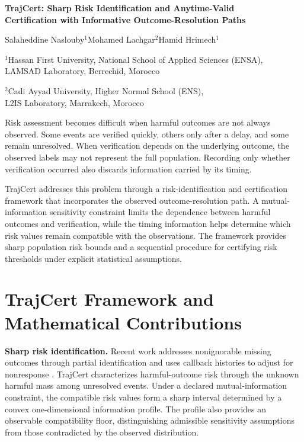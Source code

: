 \documentclass[a4paper,11pt]{article}
\begin{document}
\fontsize{10.5}{12.2}\selectfont
\begin{center}
{\fontsize{15}{17}\selectfont\bfseries TrajCert: Sharp Risk Identification and Anytime-Valid\\Certification with Informative Outcome-Resolution Paths\par}
\vspace{5pt}
Salaheddine Naslouby$^{1}$\quad Mohamed Lachgar$^{2}$\quad Hamid Hrimech$^{1}$\par
\vspace{3pt}
{\small $^{1}$Hassan First University, National School of Applied Sciences (ENSA),\\LAMSAD Laboratory, Berrechid, Morocco\par
$^{2}$Cadi Ayyad University, Higher Normal School (ENS),\\L2IS Laboratory, Marrakech, Morocco\par}
\end{center}
\vspace{-4pt}
Risk assessment becomes difficult when harmful outcomes are not always observed. Some events are verified quickly, others only after a delay, and some remain unresolved. When verification depends on the underlying outcome, the observed labels may not represent the full population. Recording only whether verification occurred also discards information carried by its timing.

TrajCert addresses this problem through a risk-identification and certification framework that incorporates the observed outcome-resolution path. A mutual-information sensitivity constraint limits the dependence between harmful outcomes and verification, while the timing information helps determine which risk values remain compatible with the observations. The framework provides sharp population risk bounds and a sequential procedure for certifying risk thresholds under explicit statistical assumptions.

\section{TrajCert Framework and Mathematical Contributions}
\begin{center}

\end{center}
\vspace{-3pt}
\textbf{Sharp risk identification.}
Recent work addresses nonignorable missing outcomes through partial identification and uses callback histories to adjust for nonresponse \cite{dalygrafstein,miao}. TrajCert characterizes harmful-outcome risk through the unknown harmful mass among unresolved events. Under a declared mutual-information constraint, the compatible risk values form a sharp interval determined by a convex one-dimensional information profile. The profile also provides an observable compatibility floor, distinguishing admissible sensitivity assumptions from those contradicted by the observed distribution.
\end{document}
